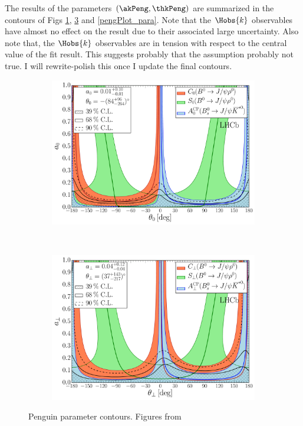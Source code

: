 The results of the parameters $(\akPeng,\thkPeng)$ are summarized in the contours of
Figs \ref{pengPlot_long}, \ref{pengPlot_perp} and \ref{pengPlot_para}. Note that the $\Hobs{k}$ observables have almost no
effect on the result due to their associated large uncertainty. Also note that, the $\Hobs{k}$ observables are in
tension with respect to the central value of the fit result. This suggests probably that the assumption
 probably not true. {\color{red} I will rewrite-polish this once I update the final contours.}

\begin{figure}[h]
\begin{center}
  \begin{subfigure}{1\textwidth}
    \includegraphics[trim=0.0cm 0.0cm 0.0cm 0.0cm, clip=true,scale=0.4]{Figures/Chapter5/Penguin_Contribution_Ang_vs_Abs_allB2VV_Long.pdf}
    \caption{}
    \label{pengPlot_long}
  \end{subfigure}\\
  \begin{subfigure}{1\textwidth}
    \includegraphics[trim=0.0cm 0.0cm 0.0cm 0.0cm, clip=true,scale=0.4]{Figures/Chapter5/Penguin_Contribution_Ang_vs_Abs_allB2VV_Perp.pdf}
    \caption{}
    \label{pengPlot_perp}
  \end{subfigure}
  \caption{Penguin parameter contours. Figures from~\cite{DeBruyn-thesis}}
\end{center}
\end{figure}

